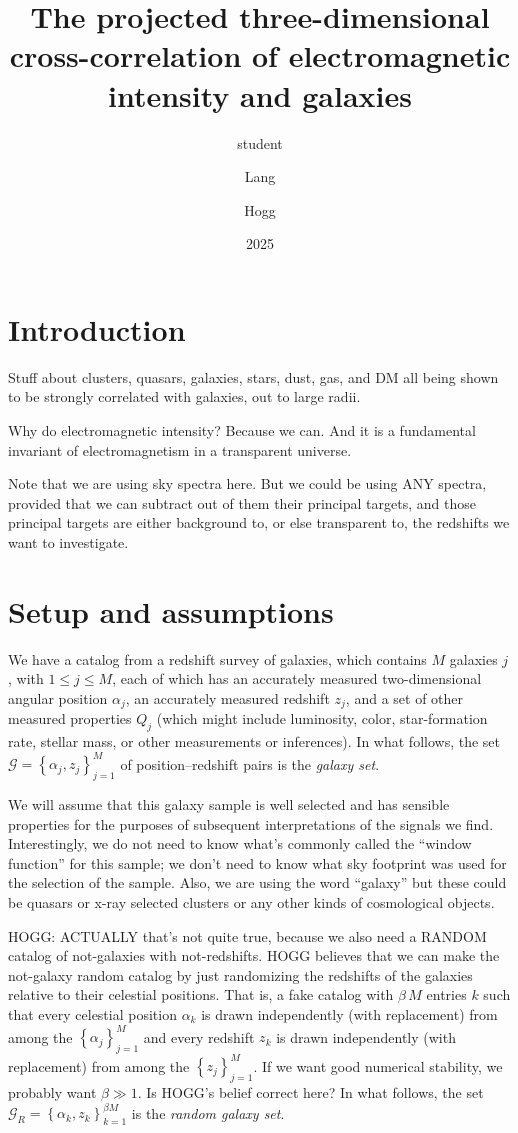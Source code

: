 \documentclass{article}
\title{\bfseries%
The projected three-dimensional cross-correlation of electromagnetic intensity and galaxies}
\author{student \and Lang \and Hogg}
\date{2025}
\newcommand{\setof}[1]{\left\{{#1}\right\}}
\newcommand{\set}[1]{\mathscr{#1}}
\begin{document}
\maketitle

\section{Introduction}
Stuff about clusters, quasars, galaxies, stars, dust, gas, and DM all being shown to be strongly correlated with galaxies, out to large radii.

Why do electromagnetic intensity? Because we can. And it is a fundamental invariant of electromagnetism in a transparent universe.

Note that we are using sky spectra here. But we could be using ANY spectra, provided that we can subtract out of them their principal targets, and those principal targets are either background to, or else transparent to, the redshifts we want to investigate.

\section{Setup and assumptions}
We have a catalog from a redshift survey of galaxies, which contains $M$ galaxies $j$, with $1\leq j\leq M$, each of which has an accurately measured two-dimensional angular position $\alpha_j$, an accurately measured redshift $z_j$, and a set of other measured properties $Q_j$ (which might include luminosity, color, star-formation rate, stellar mass, or other measurements or inferences).
In what follows, the set $\set{G}=\setof{\alpha_j, z_j}_{j=1}^M$ of position--redshift pairs is the \emph{galaxy set}.

We will assume that this galaxy sample is well selected and has sensible properties for the purposes of subsequent interpretations of the signals we find.
Interestingly, we do not need to know what's commonly called the ``window function'' for this sample; we don't need to know what sky footprint was used for the selection of the sample.
Also, we are using the word ``galaxy'' but these could be quasars or x-ray selected clusters or any other kinds of cosmological objects.

HOGG: ACTUALLY that's not quite true, because we also need a RANDOM catalog of not-galaxies with not-redshifts.
HOGG believes that we can make the not-galaxy random catalog by just randomizing the redshifts of the galaxies relative to their celestial positions.
That is, a fake catalog with $\beta\,M$ entries $k$ such that every celestial position $\alpha_k$ is drawn independently (with replacement) from among the $\setof{\alpha_j}_{j=1}^M$ and every redshift $z_k$ is drawn independently (with replacement) from among the $\setof{z_j}_{j=1}^M$.
If we want good numerical stability, we probably want $\beta\gg 1$.
Is HOGG's belief correct here?
In what follows, the set $\set{G}_R=\setof{\alpha_k,z_k}_{k=1}^{\beta M}$ is the \emph{random galaxy set}.
\end{document}
